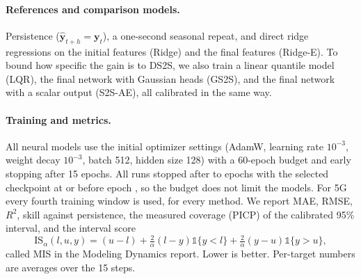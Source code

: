 \paragraph{References and comparison models.} Persistence ($\hat{\mathbf{y}}_{t+h}=\mathbf{y}_t$), a one-second seasonal repeat, and direct ridge regressions on the initial features (Ridge) and the final features (Ridge-E). To bound how specific the gain is to DS2S, we also train a linear quantile model (LQR), the final network with Gaussian heads (GS2S), and the final network with a scalar output (S2S-AE), all calibrated in the same way.

\paragraph{Training and metrics.} All neural models use the initial optimizer settings (AdamW, learning rate $10^{-3}$, weight decay $10^{-3}$, batch 512, hidden size 128) with a 60-epoch budget and early stopping after 15 epochs. All \NRuns{} runs stopped after \EpochsMin{} to \EpochsMax{} epochs with the selected checkpoint at or before epoch \BestEpochMax, so the budget does not limit the models. For 5G every fourth training window is used, for every method. We report MAE, RMSE, $R^2$, skill against persistence, the measured coverage (PICP) of the calibrated 95\% interval, and the interval score~\cite{gneiting2007strictly}
\begin{equation}
\mathrm{IS}_\alpha(l,u,y)=(u-l)+\tfrac{2}{\alpha}(l-y)\mathbb{1}\{y<l\}+\tfrac{2}{\alpha}(y-u)\mathbb{1}\{y>u\},
\end{equation}
called MIS in the Modeling Dynamics report. Lower is better. Per-target numbers are averages over the 15 steps.
